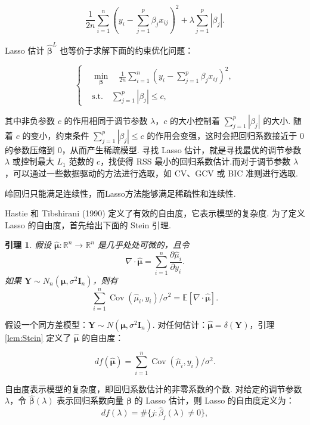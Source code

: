 \documentclass[12pt, a4paper, oneside]{ctexart}
\newtheorem{lemma}[theorem]{引理}
\begin{document}
	\begin{equation}
		\frac{1}{2n} \sum_{i=1}^{n} \left( y_i - \sum_{j=1}^{p} \beta_j x_{ij} \right)^2 + \lambda \sum_{j=1}^{p} |\beta_j|. \label{lasso}
	\end{equation}
	
	Lasso 估计 $\bm{\hat{\beta}}^L$ 也等价于求解下面的约束优化问题：
	
	\begin{equation}
		\left\{
		\begin{aligned}
			&\min_{\bm{\beta}} \quad \frac{1}{2n} \sum_{i=1}^{n} \left( y_i - \sum_{j=1}^{p} \beta_j x_{ij} \right)^2, \\
			&\text{s.t.} \quad \sum_{j=1}^{p} |\beta_j| \leq c,
		\end{aligned}
		\right. \label{equivLasso}
	\end{equation}
	
	其中非负参数 $c$ 的作用相同于调节参数 $\lambda$，$c$ 的大小控制着 $\sum_{j=1}^{p} |\beta_j|$ 的大小. 随着 $c$ 的变小，约束条件 $\sum_{j=1}^{p} |\beta_j| \leq c$ 的作用会变强，这时会把回归系数接近于 0 的参数压缩到 0，从而产生稀疏模型. 寻找 Lasso 估计，就是寻找最优的调节参数 $\lambda$ 或控制最大 $L_1$ 范数的 $c$，找使得 RSS 最小的回归系数估计.而对于调节参数 $\lambda$，可以通过一些数据驱动的方法进行选取，如 CV、GCV 或 BIC 准则进行选取.
	
	岭回归只能满足连续性，而Lasso方法能够满足稀疏性和连续性.
	
	Hastie 和 Tibshirani (1990) 定义了有效的自由度，它表示模型的复杂度. 为了定义 Lasso 的自由度，首先给出下面的 Stein 引理.
	\begin{lemma}
		假设 $\hat{\bm{\mu}}: \mathbb{R}^n \to \mathbb{R}^n$ 是几乎处处可微的，且令
		\[
		\nabla \cdot\hat{\bm{\mu}} = \sum_{i=1}^{n} \frac{\partial \hat{\mu}_i}{\partial y_i}.
		\]
		如果 $\bm{Y} \sim N_n(\bm{\mu}, \sigma^2 \bm{I}_n)$，则有
		\[
		\sum_{i=1}^{n} \operatorname{Cov}(\hat{\mu}_i, y_i)/\sigma^2 = \mathbb{E}[\nabla \cdot \hat{\bm{\mu}}].
		\]\label{lem:Stein}
	\end{lemma} 
	
	假设一个同方差模型：$\bm{Y} \sim N(\bm{\mu}, \sigma^2 \bm{I}_n)$. 对任何估计：$\hat{\bm{\mu}} = \delta(\bm{Y})$，引理\eqref{lem:Stein} 定义了 $\hat{\bm{\mu}}$ 的自由度：
	
	\begin{equation}
		df(\hat{\bm{\mu}}) = \sum_{i=1}^{n} \operatorname{Cov}(\hat{\mu}_i, y_i)/\sigma^2.
	\end{equation}
	
	自由度表示模型的复杂度，即回归系数估计的非零系数的个数. 对给定的调节参数 $\lambda$，令 $\hat{\bm{\beta}}(\lambda)$ 表示回归系数向量 $\bm{\beta}$ 的 Lasso 估计，则 Lasso 的自由度定义为：
	\begin{equation}
		df(\lambda) = \#\{j : \hat{\beta}_j(\lambda) \neq 0\},
	\end{equation}
\end{document}
